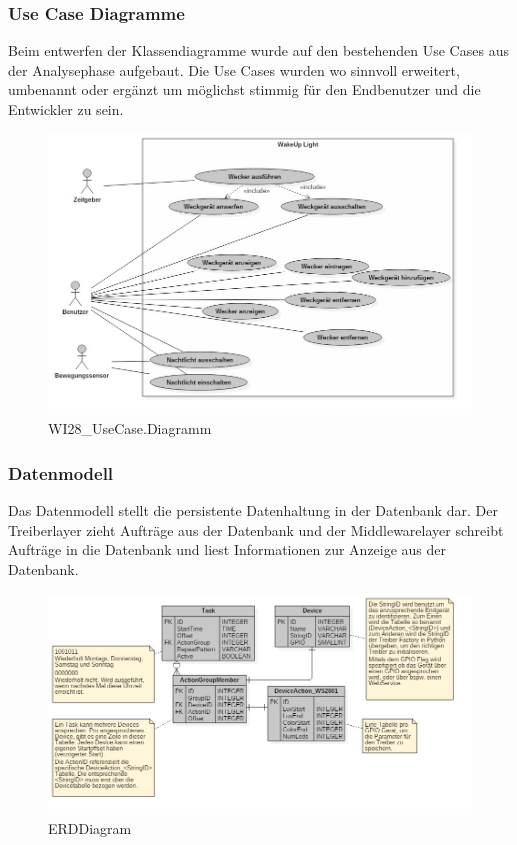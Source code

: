 \documentclass[]{article}
\begin{document}
\subsubsection{Use Case Diagramme}\label{use-case-diagramme}

Beim entwerfen der Klassendiagramme wurde auf den bestehenden Use Cases
aus der Analysephase aufgebaut. Die Use Cases wurden wo sinnvoll
erweitert, umbenannt oder ergänzt um möglichst stimmig für den
Endbenutzer und die Entwickler zu sein.

\begin{figure}[H]
\centering
\includegraphics{./WI28_UseCase_Diagramm.jpeg}
\caption{WI28\_UseCase.Diagramm}
\end{figure}

\subsubsection{Datenmodell}\label{datenmodell}

Das Datenmodell stellt die persistente Datenhaltung in der Datenbank
dar. Der Treiberlayer zieht Aufträge aus der Datenbank und der
Middlewarelayer schreibt Aufträge in die Datenbank und liest
Informationen zur Anzeige aus der Datenbank.

\begin{figure}[H]
\centering
\includegraphics{./ERDDiagram.jpeg}
\caption{ERDDiagram}
\end{figure}
\end{document}
